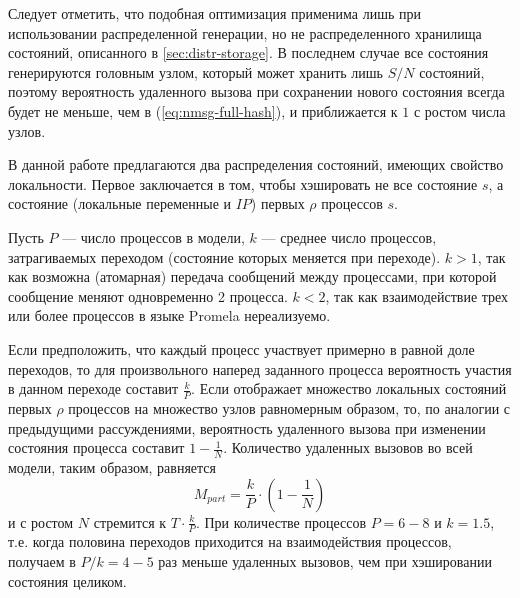 Следует отметить, что подобная оптимизация применима лишь при использовании распределенной
генерации, но не распределенного хранилища состояний, описанного в
\ref{sec:distr-storage}. В последнем случае все состояния генерируются головным узлом,
который может хранить лишь $S/N$ состояний, поэтому вероятность удаленного вызова при
сохранении нового состояния всегда будет не меньше, чем в (\ref{eq:nmsg-full-hash}), и
приближается к $1$ с ростом числа узлов.

В данной работе предлагаются два распределения состояний, имеющих свойство
локальности. Первое заключается в том, чтобы хэшировать не все состояние $s$, а состояние
(локальные переменные и $IP$) первых $\rho$ процессов $s$.

Пусть $P$ — число процессов в модели, $k$ — среднее число процессов, затрагиваемых
переходом (состояние которых меняется при переходе). $k > 1$, так как возможна (атомарная)
передача сообщений между процессами, при которой сообщение меняют одновременно 2
процесса. $k < 2$, так как взаимодействие трех или более процессов в языке Promela
нереализуемо.

Если предположить, что каждый процесс участвует примерно в равной доле переходов, то для
произвольного наперед заданного процесса вероятность участия в данном переходе составит
$\frac{k}{P}$. Если  отображает множество локальных состояний первых
$\rho$ процессов на множество узлов равномерным образом, то, по аналогии с предыдущими
рассуждениями, вероятность удаленного вызова при изменении состояния процесса составит $1
- \frac{1}{N}$. Количество удаленных вызовов во всей модели, таким образом, равняется
\begin{equation}
  \label{eq:nmsg-firstproc-hash}
  M_{part} = \frac{k}{P} \cdot (1 - \frac{1}{N})
\end{equation}
и с ростом $N$ стремится к $T \cdot \frac{k}{P}$. При количестве процессов $P = 6-8$ и $k
= 1.5$, т.е. когда половина переходов приходится на взаимодействия процессов, получаем в
$P/k = 4-5$ раз меньше удаленных вызовов, чем при хэшировании состояния целиком.

